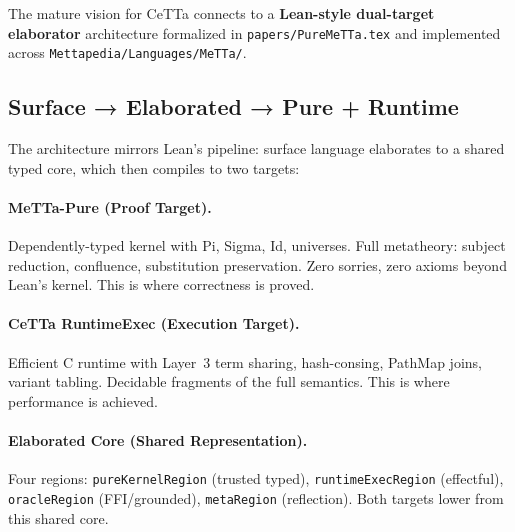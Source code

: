 \documentclass[11pt]{article}
\newcommand{\code}[1]{\texttt{#1}}
\newcommand{\CeTTa}{\textup{CeTTa}}
\newcommand{\PathMap}{\textup{PathMap}}
\begin{document}
The mature vision for \CeTTa{} connects to a \textbf{Lean-style dual-target
elaborator} architecture formalized in \code{papers/PureMeTTa.tex} and
implemented across \code{Mettapedia/Languages/MeTTa/}.

\subsection{Surface → Elaborated → Pure + Runtime}

The architecture mirrors Lean's pipeline: surface language elaborates to
a shared typed core, which then compiles to two targets:

\begin{center}
\end{center}

\paragraph{MeTTa-Pure (Proof Target).}
Dependently-typed kernel with Pi, Sigma, Id, universes.  Full metatheory:
subject reduction, confluence, substitution preservation.  Zero sorries,
zero axioms beyond Lean's kernel.  This is where correctness is proved.

\paragraph{CeTTa RuntimeExec (Execution Target).}
Efficient C runtime with Layer~3 term sharing, hash-consing, \PathMap{}
joins, variant tabling.  Decidable fragments of the full semantics.
This is where performance is achieved.

\paragraph{Elaborated Core (Shared Representation).}
Four regions: \code{pureKernelRegion} (trusted typed),
\code{runtimeExecRegion} (effectful), \code{oracleRegion} (FFI/grounded),
\code{metaRegion} (reflection).  Both targets lower from this shared core.
\end{document}

